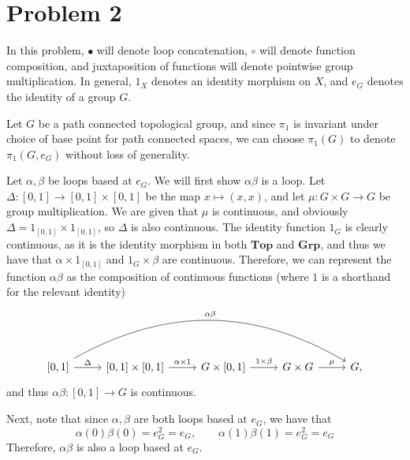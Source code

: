 \documentclass[11pt, letterpaper]{article}
\begin{document}
\section*{Problem 2}
\begin{notation}
In this problem, $\bullet$ will denote loop concatenation, $\circ $ will denote function composition, and juxtaposition of functions will denote pointwise group multiplication. In general, $1_X$ denotes an identity morphism on $X$, and $e_G$ denotes the identity of a group $G$.
\end{notation}


Let $G$ be a path connected topological group, and since $\pi _1$ is invariant under choice of base point for path connected spaces, we can choose $\pi _1(G)$ to denote $\pi _1(G,e_G)$ without loss of generality.

Let $\alpha ,\beta $ be loops based at $e_G$. We will first show $\alpha \beta $ is a loop. Let $\Delta : [0,1] \to [0,1]\times [0,1]$ be the map $x\mapsto (x,x)$, and let $\mu : G\times G \to G$ be group multiplication. We are given that $\mu $ is continuous, and obviously $\Delta =1_{\left[ 0,1 \right] } \times 1_{\left[ 0,1 \right] } $, so $\Delta $ is also continuous. The identity function $1_G$ is clearly continuous, as it is the identity morphism in both $\mathbf{Top} $ and $\mathbf{Grp} $, and thus we have that $\alpha \times 1_{\left[ 0,1 \right] } $ and $1_{G} \times \beta $ are continuous. Therefore, we can represent the function $\alpha \beta $ as the composition of continuous functions (where $1$ is a shorthand for the relevant identity)
\[\begin{tikzcd}[row sep = 2.5em, column sep = 2.5em]
\left[ 0,1 \right] \ar[" \Delta  ", r]\ar[bend left, " \alpha \beta  ", rrrr]  & \left[ 0,1 \right] \times \left[ 0,1 \right] \ar[" \alpha \times 1 ", r]  & G \times \left[ 0,1 \right] \ar[" 1\times \beta  ", r]  & G\times G\ar[" \mu  ", r]  & G,
\end{tikzcd}\]
and thus $\alpha \beta : [0,1] \to G$ is continuous.

Next, note that since $\alpha ,\beta $ are both loops based at $e_G$, we have that
\[
	\alpha(0)\beta (0)=e_G^2=e_G,\qquad \alpha (1)\beta (1)=e_G^2=e_G
\]
Therefore, $\alpha \beta $ is also a loop based at $e_G$.
\end{document}
